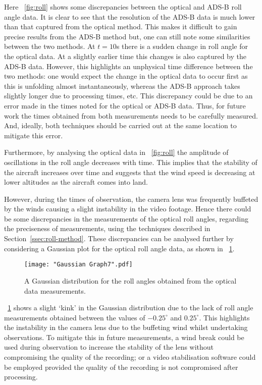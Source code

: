 \documentclass[11pt]{article}
\newcommand{\figref}[2][\figurename~]{#1\ref{#2}}
\newcommand{\secref}[2][Section~]{#1\ref{#2}}
\begin{document}
Here \figref{fig:roll} shows some discrepancies between the optical and ADS-B roll angle data. It is clear to see that the resolution of the ADS-B data is much lower than that captured from the optical method. This makes it difficult to gain precise results from the ADS-B method but, one can still note some similarities between the two methods. At $t = 10$s there is a sudden change in roll angle for the optical data. At a slightly earlier time this changes is also captured by the ADS-B data. However, this highlights an unphysical time difference between the two methods: one would expect the change in the optical data to occur first as this is unfolding almost instantaneously, whereas the ADS-B approach takes slightly longer due to processing times, etc. This discrepancy could be due to an error made in the times noted for the optical or ADS-B data. Thus, for future work the times obtained from both measurements needs to be carefully measured. And, ideally, both techniques should be carried out at the same location to mitigate this error.

Furthermore, by analysing the optical data in \figref{fig:roll} the amplitude of oscillations in the roll angle decreases with time. This implies that the stability of the aircraft increases over time and suggests that the wind speed is decreasing at lower altitudes as the aircraft comes into land. 

However, during the times of observation, the camera lens was frequently buffeted by the winds causing a slight instability in the video footage. Hence there could be some discrepancies in the measurements of the optical roll angles, regarding the preciseness of measurements, using the techniques described in \secref{ssec:roll-method}. These discrepancies can be analysed further by considering a Gaussian plot for the optical roll angle data, as shown in \figref{fig:Gaussian-roll}.

\begin{figure}[h]
\centering
\texttt{[image: "Gaussian Graph7".pdf]}
\caption{A Gaussian distribution for the roll angles obtained from the optical data measurements.}
\label{fig:Gaussian-roll}
\end{figure}

\figref{fig:Gaussian-roll} shows a slight `kink' in the Gaussian distribution due to the lack of roll angle measurements obtained between the values of $-0.25^{\circ}$ and $0.25^{\circ}$. This highlights the instability in the camera lens due to the buffeting wind whilst undertaking observations. To mitigate this in future measurements, a wind break could be used during observation to increase the stability of the lens without compromising the quality of the recording; or a video stabilisation software could be employed provided the quality of the recording is not compromised after processing.
\end{document}
